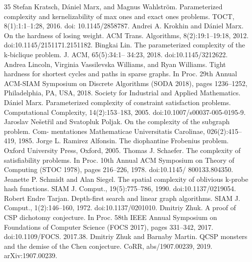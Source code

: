 \begin{thebibliography}{35}
Stefan Kratsch, Dániel Marx, and Magnus Wahlström. Parameterized complexity and kernelizability of max ones and exact ones problems. TOCT, 8(1):1:1–1:28, 2016. doi: 10.1145/2858787.
Andrei A. Krokhin and Dániel Marx. On the hardness of losing weight. ACM Trans. Algorithms, 8(2):19:1–19:18, 2012. doi:10.1145/2151171.2151182.
Bingkai Lin. The parameterized complexity of the k-biclique problem. J. ACM, 65(5):34:1– 34:23, 2018. doi:10.1145/3212622.
Andrea Lincoln, Virginia Vassilevska Williams, and Ryan Williams. Tight hardness for shortest cycles and paths in sparse graphs. In Proc. 29th Annual ACM-SIAM Symposium on Discrete Algorithms (SODA 2018), pages 1236–1252, Philadelphia, PA, USA, 2018. Society for Industrial and Applied Mathematics.
Dániel Marx. Parameterized complexity of constraint satisfaction problems. Computational Complexity, 14(2):153–183, 2005. doi:10.1007/s00037-005-0195-9.
Jaroslav Nešetřil and Svatopluk Poljak. On the complexity of the subgraph problem. Com- mentationes Mathematicae Universitatis Carolinae, 026(2):415–419, 1985.
Jorge L. Ramirez Alfonsin. The diophantine Frobenius problem. Oxford University Press, Oxford, 2005.
Thomas J. Schaefer. The complexity of satisfiability problems. In Proc. 10th Annual ACM Symposium on Theory of Computing (STOC 1978), pages 216–226, 1978. doi:10.1145/ 800133.804350.
Jeanette P. Schmidt and Alan Siegel. The spatial complexity of oblivious k-probe hash functions. SIAM J. Comput., 19(5):775–786, 1990. doi:10.1137/0219054.
Robert Endre Tarjan. Depth-first search and linear graph algorithms. SIAM J. Comput., 1(2):146–160, 1972. doi:10.1137/0201010.
Dmitriy Zhuk. A proof of CSP dichotomy conjecture. In Proc. 58th IEEE Annual Symposium on Foundations of Computer Science (FOCS 2017), pages 331–342, 2017. doi:10.1109/FOCS. 2017.38.
Dmitriy Zhuk and Barnaby Martin. QCSP monsters and the demise of the Chen conjecture. CoRR, abs/1907.00239, 2019. arXiv:1907.00239.
\end{thebibliography}
